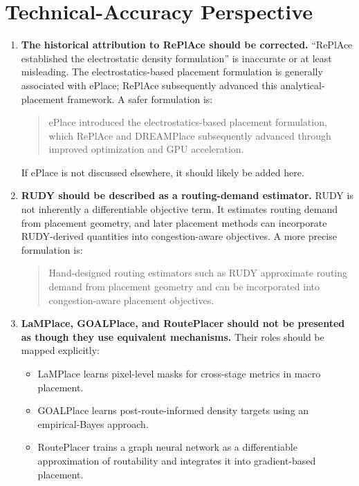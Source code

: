 \documentclass[11pt]{article}
\begin{document}
\section{Technical-Accuracy Perspective}

\begin{enumerate}
  \item \textbf{The historical attribution to RePlAce should be corrected.}
  ``RePlAce established the electrostatic density formulation'' is inaccurate
  or at least misleading. The electrostatics-based placement formulation is
  generally associated with ePlace; RePlAce subsequently advanced this
  analytical-placement framework. A safer formulation is:

  \begin{quote}
  ePlace introduced the electrostatics-based placement formulation, which
  RePlAce and DREAMPlace subsequently advanced through improved optimization
  and GPU acceleration.
  \end{quote}

  If ePlace is not discussed elsewhere, it should likely be added here.

  \item \textbf{RUDY should be described as a routing-demand estimator.} RUDY
  is not inherently a differentiable objective term. It estimates routing
  demand from placement geometry, and later placement methods can incorporate
  RUDY-derived quantities into congestion-aware objectives. A more precise
  formulation is:

  \begin{quote}
  Hand-designed routing estimators such as RUDY approximate routing demand
  from placement geometry and can be incorporated into congestion-aware
  placement objectives.
  \end{quote}

  \item \textbf{LaMPlace, GOALPlace, and RoutePlacer should not be presented as
  though they use equivalent mechanisms.} Their roles should be mapped
  explicitly:
  \begin{itemize}
    \item LaMPlace learns pixel-level masks for cross-stage metrics in macro
    placement.
    \item GOALPlace learns post-route-informed density targets using an
    empirical-Bayes approach.
    \item RoutePlacer trains a graph neural network as a differentiable
    approximation of routability and integrates it into gradient-based
    placement.
  \end{itemize}


\end{enumerate}
\end{document}
